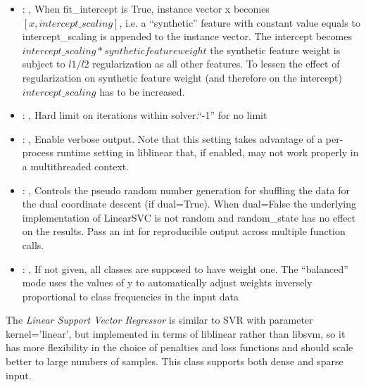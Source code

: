 \begin{itemize}
    \item {}: , 
      When fit\_intercept is True, instance vector x becomes $[x, intercept\_scaling]$,
      i.e. a “synthetic” feature with constant value equals to intercept\_scaling is appended
      to the instance vector. The intercept becomes $intercept\_scaling * synthetic feature weight$
      \nb the synthetic feature weight is subject to $l1/l2$ regularization as all other features.
      To lessen the effect of regularization on synthetic feature weight (and therefore on the
      intercept)                                                  $intercept\_scaling$ has to be
      increased.

    \item {}: , 
      Hard limit on iterations within solver.``-1'' for no limit

    \item {}: , 
      Enable verbose output. Note that this setting takes advantage
      of a per-process runtime setting in liblinear that, if enabled, may not
      work properly in a multithreaded context.

    \item {}: , 
      Controls the pseudo random number generation for shuffling
      the data for the dual coordinate descent (if dual=True). When dual=False
      the underlying implementation of LinearSVC is not random and
      random\_state has no effect on the results. Pass an int for reproducible
      output across multiple function calls.

    \item {}: \xmlDesc{[balanced]}, 
      If not given, all classes are supposed to have weight one.
      The “balanced” mode uses the values of y to automatically adjust weights
      inversely proportional to class frequencies in the input data
  \end{itemize}
 The  \textit{Linear Support Vector Regressor} is
 similar to SVR with parameter kernel=’linear’, but implemented in terms of liblinear rather than
 libsvm,                             so it has more flexibility in the choice of penalties and loss
 functions and should scale better to large numbers of samples.                             This
 class supports both dense and sparse input.

